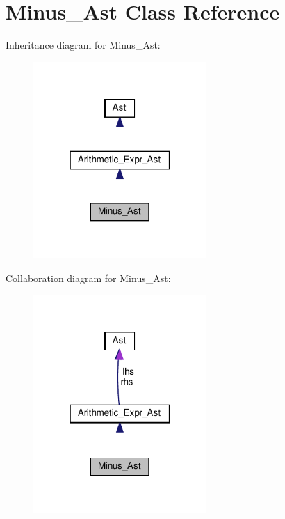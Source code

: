 \hypertarget{classMinus__Ast}{}\section{Minus\+\_\+\+Ast Class Reference}
\label{classMinus__Ast}


Inheritance diagram for Minus\+\_\+\+Ast\+:
\nopagebreak
\begin{figure}[H]
\begin{center}
\leavevmode
\includegraphics[width=187pt]{classMinus__Ast__inherit__graph}
\end{center}
\end{figure}


Collaboration diagram for Minus\+\_\+\+Ast\+:
\nopagebreak
\begin{figure}[H]
\begin{center}
\leavevmode
\includegraphics[width=187pt]{classMinus__Ast__coll__graph}
\end{center}
\end{figure}

